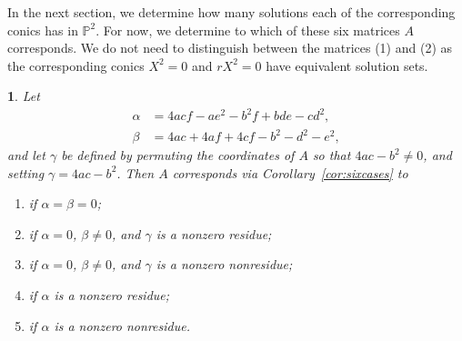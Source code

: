 \documentclass[10pt,a4paper]{amsart}
\numberwithin{equation}{section}
\numberwithin{figure}{section}
\theoremstyle{definition}
\theoremstyle{remark}
\theoremstyle{plain}
\newtheorem{thm}{\protect\theoremname}[section]
\theoremstyle{plain}
\theoremstyle{definition}
\theoremstyle{plain}
\theoremstyle{plain}
\providecommand{\theoremname}{Theorem}
\renewcommand{\P}{\mathbb{P}}
\begin{document}
	In the next section, we determine how many solutions each of the corresponding conics has in $\P^2$. For now, we determine to which of these six matrices $A$ corresponds. We do not need to distinguish between the matrices (1) and (2) as the corresponding conics $X^2=0$ and $rX^2=0$ have equivalent solution sets.
	
	\begin{thm}\label{thm:diag-P2}
	Let
	\begin{align*}
	\alpha&=4acf-ae^2-b^2f+bde-cd^2,\\
	\beta&=4ac+4af+4cf-b^2-d^2-e^2,
	\end{align*}
	and let $\gamma$ be defined by permuting the coordinates of $A$ so that $4ac-b^2\ne 0$, and setting $\gamma=4ac-b^2$. Then $A$ corresponds via Corollary~\ref{cor:sixcases} to
	\begin{enumerate}
	\item[(1) or (2)] if  $\alpha=\beta=0$;
	\item[(3)] if $\alpha=0$, $\beta\ne 0$, and $\gamma$ is a nonzero residue;
	\item[(4)] if $\alpha=0$, $\beta\ne 0$, and $\gamma$ is a nonzero nonresidue;
	\item[(5)] if $\alpha$ is a nonzero residue;
	\item[(6)] if $\alpha$ is a nonzero nonresidue.
	\end{enumerate}
	\end{thm}
\end{document}
